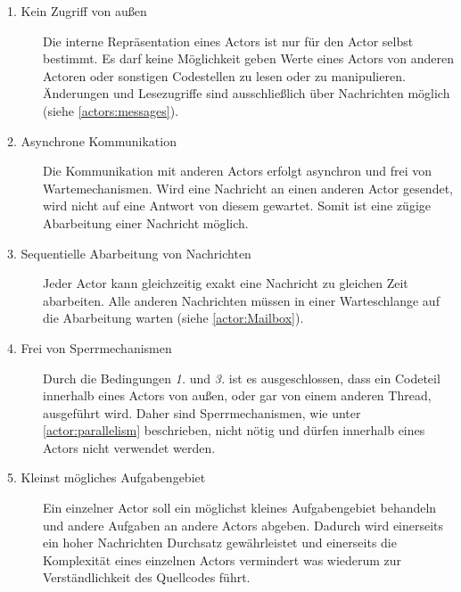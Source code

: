 \begin{description}
    \item[1. Kein Zugriff von außen]\label{actor:requirements:shareNothing}
    Die interne Repräsentation eines Actors ist nur für den Actor selbst bestimmt. Es darf keine Möglichkeit geben Werte eines Actors von anderen Actoren oder sonstigen Codestellen zu lesen oder zu manipulieren. Änderungen und Lesezugriffe sind ausschließlich über Nachrichten möglich (siehe \ref{actors:messages}). 
    \item[2. Asynchrone Kommunikation]\label{actor:requirements:AsynchronCommunication}
    Die Kommunikation mit anderen Actors erfolgt asynchron und frei von Wartemechanismen. Wird eine Nachricht an einen anderen Actor gesendet, wird nicht auf eine Antwort von diesem gewartet. Somit ist eine zügige Abarbeitung einer Nachricht möglich.
    \item[3. Sequentielle Abarbeitung von Nachrichten]
    Jeder Actor kann gleichzeitig exakt eine Nachricht zu gleichen Zeit abarbeiten. Alle anderen Nachrichten müssen in einer Warteschlange auf die Abarbeitung warten (siehe \ref{actor:Mailbox}).
    \item[4. Frei von Sperrmechanismen]
    Durch die Bedingungen \textit{1.} und  \textit{3.} ist es ausgeschlossen, dass ein Codeteil innerhalb eines Actors von außen, oder gar von einem anderen Thread, ausgeführt wird. Daher sind Sperrmechanismen, wie unter \ref{actor:parallelism} beschrieben, nicht nötig und dürfen innerhalb eines Actors nicht verwendet werden.
    \item[5. Kleinst mögliches Aufgabengebiet]
    Ein einzelner Actor soll ein möglichst kleines Aufgabengebiet behandeln und andere Aufgaben an andere Actors abgeben. Dadurch wird einerseits ein hoher Nachrichten Durchsatz gewährleistet und einerseits die Komplexität eines einzelnen Actors vermindert was wiederum zur Verständlichkeit des Quellcodes führt.
\end{description}


